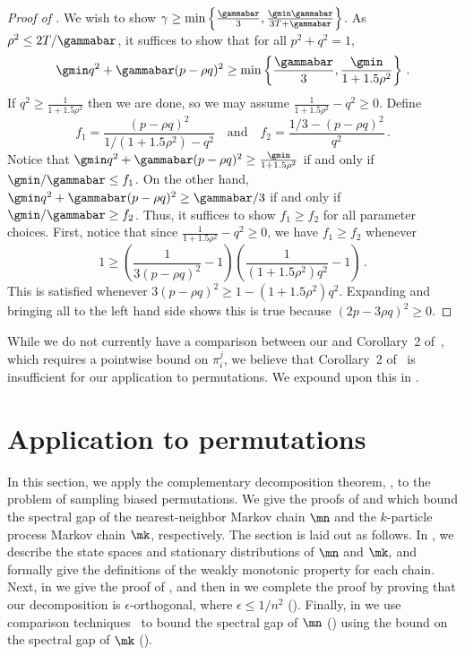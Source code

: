 \documentclass{toc}
\begin{document}
%
%
%
\begin{proof}[Proof of ]
We wish to show $\gamma\geq \min\left\{\frac{\gammabar}{3}, 
\frac{\gmin\gammabar}{3T+\gammabar}\right\}$. As $\rho^2\leq 
2T/\gammabar$, it suffices to show that for all $p^2+q^2=1$,
 \[\gmin q^2+\gammabar(p-\rho q)^2\geq \min\left\{\frac{\gammabar}{3}, \frac{\gmin}{1+1.5\rho^2}\right\}\,.\]
 If $q^2\geq \frac{1}{1+1.5\rho^2}$ then we are done, so we may assume
 $\frac{1}{1+1.5\rho^2}-q^2\geq 0$.
 Define
  \[f_1=\frac{(p-\rho q)^2}{1/(1+1.5\rho^2) - q^2} \quad \text{and}
  \quad f_2=\frac{1/3 - (p-\rho q)^2}{q^2}\,.\]
 Notice that $\gmin q^2+\gammabar(p-\rho q)^2\geq
 \frac{\gmin}{1+1.5\rho^2}$ if and only if $\gmin/\gammabar\leq f_1$.
 On the other hand, $\gmin q^2+\gammabar(p-\rho q)^2\geq \gammabar/3$ if
 and only if $\gmin/\gammabar\geq f_2$.  Thus, it suffices to show
 $f_1\geq f_2$ for all parameter choices.
First, notice that since $\frac{1}{1+1.5\rho^2}-q^2\geq 0$, we have  $f_1\geq f_2$ whenever
 \[1\geq \left(\frac{1}{3(p-\rho
   q)^2}-1\right)\left(\frac{1}{(1+1.5\rho^2)q^2}-1\right)\,.\]
This is satisfied whenever $3(p-\rho q)^2\geq 1-(1+1.5\rho^2)q^2$.
Expanding and bringing all to the left hand side shows this is true because $(2p-3\rho q)^2\geq 0$.
\end{proof}
%

While we do not currently have a comparison between our
 and Corollary~2 of~\cite{jstv04}, which requires
a pointwise bound on $\pi_i^j$, we believe that Corollary~2 of~\cite{jstv04}
is insufficient for our application to permutations.  We expound
upon this in .


\section{Application to permutations}\label{sec:perm}
In this section, we apply the complementary decomposition theorem, 
, to the problem of sampling biased permutations.  
We give the proofs of  and  which bound the spectral gap of the nearest-neighbor Markov chain $\mn$ and the $k$-particle process Markov chain $\mk$, respectively.  
The section is laid out as follows.  In , 
we describe the state spaces and stationary distributions of $\mn$ and $\mk,$ and formally give the definitions of the weakly monotonic 
property for each chain.  Next, in  we give the proof of 
, and then in  we complete the 
proof by proving that our decomposition is 
%
$\epsilon$-orthogonal, where $\epsilon\leq 1/n^2$ %
(). Finally, in  we use comparison techniques~\cite{dsc, RT98} to bound the spectral gap of $\mn$ () using the bound on the spectral gap of $\mk$ ().   
\end{document}
